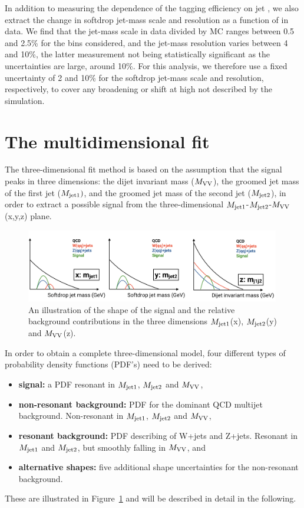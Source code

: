 In addition to measuring the dependence of the tagging efficiency on jet \PT, we  also extract the change in softdrop jet-mass scale and resolution as a function of \PT in data. We find that the jet-mass scale in data divided by MC ranges between 0.5 and 2.5\% for the \PT bins considered, and the jet-mass resolution varies between 4 and 10\%, the latter measurement not being statistically significant as the uncertainties are large, around 10\%. For this analysis, we therefore use a fixed uncertainty of 2 and 10\% for the softdrop jet-mass scale and resolution, respectively, to cover any broadening or shift at high \PT not described by the simulation.
   
\clearpage    
\section{The multidimensional fit}
\label{sec:searchIII:fit3d}
The three-dimensional fit method is based on the assumption that the signal peaks in three dimensions: the dijet invariant mass ($M_{\rm VV}$), the groomed jet mass of the first jet ($M_{\rm jet1})$, and the groomed jet mass of the second jet ($M_{\rm jet2}$), in order to extract a possible signal from the three-dimensional $M_{\rm jet1}$-$M_{\rm jet2}$-$M_{\rm VV}$ (x,y,z) plane.\newline
\begin{figure}[h!]
\centering
\includegraphics[width=0.99\textwidth]{figures/analysis/search3/misc/3Dfit.png}
\caption{An illustration of the shape of the signal and the relative background contributions in the three dimensions $M_{\rm jet1}$(x), $M_{\rm jet2}$(y) and $M_{\rm VV}$(z). }
\label{fig:searchIII:3Dfit}
\end{figure}
\noindent In order to obtain a complete three-dimensional model, four different types of probability density functions (PDF's) need to be derived:
\begin{itemize}
   \itemsep0em
  \item \textbf{signal:} a PDF resonant in $M_{\rm jet1}$, $M_{\rm jet2}$ and $M_{\rm VV}$,
  \item \textbf{non-resonant background:} PDF for the dominant QCD multijet background. Non-resonant in $M_{\rm jet1}$, $M_{\rm jet2}$ and $M_{\rm VV}$,
  \item \textbf{resonant background:} PDF describing of W+jets and Z+jets. Resonant in $M_{\rm jet1}$ and $M_{\rm jet2}$, but smoothly falling in $M_{\rm VV}$, and
  \item \textbf{alternative shapes:} five additional shape uncertainties for the non-resonant background.
\end{itemize}
These are illustrated in Figure~\ref{fig:searchIII:3Dfit} and will be described in detail in the following.
\clearpage

